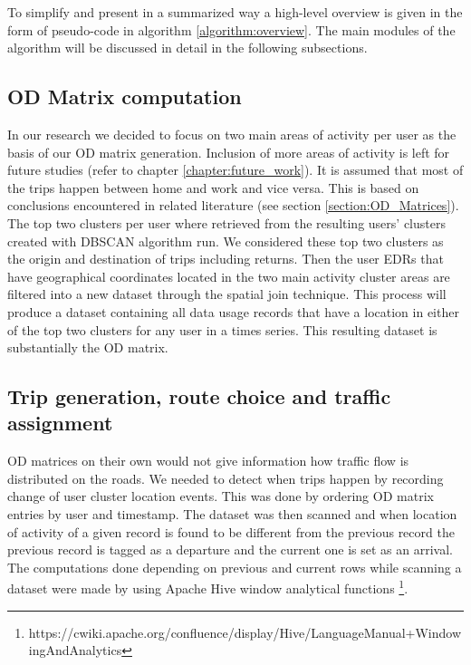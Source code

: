 \documentclass[12pt, a4paper]{report}
\theoremstyle{definition}
\theoremstyle{definition}%
\theoremstyle{definition}%
\theoremstyle{definition}%
\theoremstyle{definition}%
\theoremstyle{definition}%
\begin{document}
To simplify and present in a summarized way a high-level overview is given in the form of pseudo-code in algorithm \ref{algorithm:overview}. The main modules of the algorithm will be discussed in detail in the following subsections.
 
\subsection{OD Matrix computation}   \label{subsection:odmatrix_computation}
In our research we decided to focus on two main areas of activity per user as the basis of our OD matrix generation. Inclusion of more areas of activity is left for future studies (refer to chapter \ref{chapter:future_work}). It is assumed that most of the trips happen between home and work and vice versa. This is based on conclusions encountered in related literature (see section \ref{section:OD_Matrices}). 
The top two clusters per user where retrieved from the resulting users' clusters created with DBSCAN algorithm run. We considered these top two clusters as the origin and destination of trips including returns. Then the user EDRs that have geographical coordinates located in the two main activity cluster areas are filtered into a new dataset through the spatial join technique. This process will produce a dataset containing all data usage records that have a location in either of the top two clusters for any user in a times series. This resulting dataset is substantially the OD matrix.

\subsection{Trip generation, route choice and traffic assignment} \label{subsection:trip_generation}

OD matrices on their own would not give information how traffic flow is distributed on the roads. We needed to detect when trips happen by recording change of user cluster location events. This was done by ordering OD matrix entries by user and timestamp. The dataset was then scanned and when location of activity of a given record is found to be different from the previous record the previous record is tagged as a departure and the current one is set as an arrival. The computations done depending on previous and current rows while scanning a dataset were made by using Apache Hive window analytical functions \footnote{https://cwiki.apache.org/confluence/display/Hive/LanguageManual+WindowingAndAnalytics}. 
\end{document}
